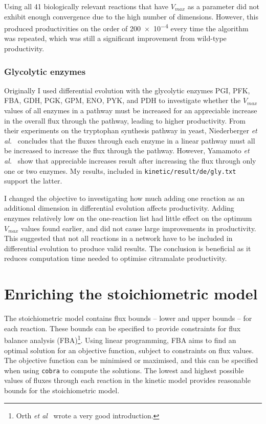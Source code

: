 \documentclass[parskip=full, numbers=noenddot]{scrreprt}
\begin{document}
Using all 41 biologically relevant reactions that have $V_{max}$ as a parameter did not exhibit enough convergence due to the high number of dimensions. However, this produced productivities on the order of \num{200e-4} every time the algorithm was repeated, which was still a significant improvement from wild-type productivity.
\subsection{Glycolytic enzymes}
\label{ssec:glycolytic}

Originally I used differential evolution with the glycolytic enzymes PGI, PFK, FBA, GDH, PGK, GPM, ENO, PYK, and PDH to investigate whether the $V_{max}$ values of all enzymes in a pathway must be increased for an appreciable increase in the overall flux through the pathway, leading to higher productivity. From their experiments on the tryptophan synthesis pathway in yeast, Niederberger \emph{et al.}~\cite{niederberger_strategy_1992} concludes that the fluxes through each enzyme in a linear pathway must all be increased to increase the flux through the pathway. However, Yamamoto \emph{et al.}~\cite{yamamoto_overexpression_2012} show that appreciable increases result after increasing the flux through only one or two enzymes. My results, included in \texttt{kinetic/result/de/gly.txt} support the latter.

I changed the objective to investigating how much adding one reaction as an additional dimension in differential evolution affects productivity. Adding enzymes relatively low on the one-reaction list had little effect on the optimum $V_{max}$ values found earlier, and did not cause large improvements in productivity. This suggested that not all reactions in a network have to be included in differential evolution to produce valid results. The conclusion is beneficial as it reduces computation time needed to optimise citramalate productivity.

\chapter{Enriching the stoichiometric model}
\label{ch:stoich}

The stoichiometric model contains flux bounds -- lower and upper bounds -- for each reaction. These bounds can be specified to provide constraints for flux balance analysis (FBA)\footnote{Orth \emph{et al}~\cite{orth_what_2010} wrote a very good introduction.}. Using linear programming, FBA aims to find an optimal solution for an objective function, subject to constraints on flux values. The objective function can be minimised or maximised, and this can be specified when using \texttt{cobra} to compute the solutions. The lowest and highest possible values of fluxes through each reaction in the kinetic model provides reasonable bounds for the stoichiometric model.
\end{document}
